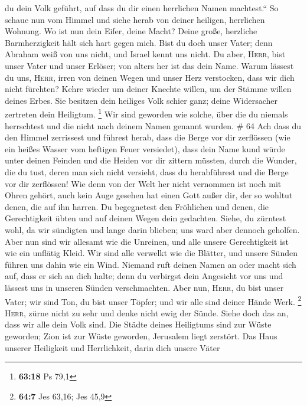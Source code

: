 du dein Volk geführt, auf dass du dir einen herrlichen Namen machtest.``
 So schaue nun vom Himmel und siehe herab von deiner
heiligen, herrlichen Wohnung. Wo ist nun dein Eifer, deine Macht? Deine
große, herzliche Barmherzigkeit hält sich hart gegen mich.
 Bist du doch unser Vater; denn Abraham weiß von uns
nicht, und Israel kennt uns nicht. Du aber, \textsc{Herr}, bist unser
Vater und unser Erlöser; von alters her ist das dein Name.
 Warum lässest du uns, \textsc{Herr}, irren von deinen
Wegen und unser Herz verstocken, dass wir dich nicht fürchten? Kehre
wieder um deiner Knechte willen, um der Stämme willen deines Erbes.
 Sie besitzen dein heiliges Volk schier ganz; deine
Widersacher zertreten dein Heiligtum. \footnote{\textbf{63:18} Ps 79,1}
 Wir sind geworden wie solche, über die du niemals
herrschtest und die nicht nach deinem Namen genannt wurden. \# 64
 Ach dass du den Himmel zerrissest und führest herab, dass
die Berge vor dir zerflössen (wie ein heißes Wasser vom heftigen Feuer
versiedet), dass dein Name kund würde unter deinen Feinden und die
Heiden vor dir zittern müssten,  durch die Wunder, die du
tust, deren man sich nicht versieht, dass du herabführest und die Berge
vor dir zerflössen!  Wie denn von der Welt her nicht
vernommen ist noch mit Ohren gehört, auch kein Auge gesehen hat einen
Gott außer dir, der so wohltut denen, die auf ihn harren. 
Du begegnetest den Fröhlichen und denen, die Gerechtigkeit übten und auf
deinen Wegen dein gedachten. Siehe, du zürntest wohl, da wir sündigten
und lange darin blieben; uns ward aber dennoch geholfen. 
Aber nun sind wir allesamt wie die Unreinen, und alle unsere
Gerechtigkeit ist wie ein unflätig Kleid. Wir sind alle verwelkt wie die
Blätter, und unsere Sünden führen uns dahin wie ein Wind. 
Niemand ruft deinen Namen an oder macht sich auf, dass er sich an dich
halte; denn du verbirgst dein Angesicht vor uns und lässest uns in
unseren Sünden verschmachten.  Aber nun, \textsc{Herr}, du
bist unser Vater; wir sind Ton, du bist unser Töpfer; und wir alle sind
deiner Hände Werk. \footnote{\textbf{64:7} Jes 63,16; Jes 45,9}
 \textsc{Herr}, zürne nicht zu sehr und denke nicht ewig
der Sünde. Siehe doch das an, dass wir alle dein Volk sind.
 Die Städte deines Heiligtums sind zur Wüste geworden;
Zion ist zur Wüste geworden, Jerusalem liegt zerstört. 
Das Haus unserer Heiligkeit und Herrlichkeit, darin dich unsere Väter
